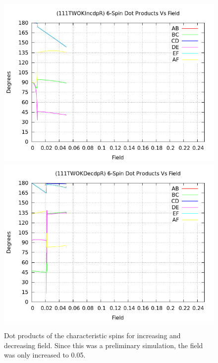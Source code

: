 \documentclass{article}
\begin{document}
\begin{figure}[ht]
\centering
\includegraphics[scale=0.5]{HVariedData/Pictures/111TWOKIncdpR.png}
\includegraphics[scale=0.5]{HVariedData/Pictures/111TWOKDecdpR.png}
\caption{Dot products of the characteristic spins for increasing and decreasing field. 
Since this was a preliminary simulation, the field was only increased to 0.05. }
\end{figure}
\clearpage
\end{document}
